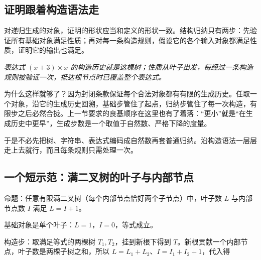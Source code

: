 \subsection{证明跟着构造语法走}

对递归生成的对象，证明的形状应当和定义的形状一致。结构归纳只有两步：先验证所有基础对象满足性质；再对每一条构造规则，假设它的各个输入对象都满足性质，证明它的输出也满足。

\begin{center}

\emph{表达式 \((x+3)\times x\) 的构造历史就是这棵树；性质从叶子出发，每经过一条构造规则被验证一次，抵达根节点时已覆盖整个表达式。}
\end{center}

为什么这样就够了？因为封闭条款保证每个合法对象都有有限的生成历史。任取一个对象，沿它的生成历史回溯，基础步管住了起点，归纳步管住了每一次构造，有限步之后必然合拢。上一节要求的良基顺序在这里也有了着落：``更小''就是``在生成历史中更早''，生成步数是一个取值于自然数、严格下降的度量。

于是不必先把树、字符串、表达式编码成自然数再套普通归纳。沿构造语法一层层走上去就行，而且每条规则只需处理一次。

\subsection{一个短示范：满二叉树的叶子与内部节点}

命题：任意有限满二叉树（每个内部节点恰好两个子节点）中，叶子数 \(L\) 与内部节点数 \(I\) 满足 \(L=I+1\)。

基础对象是单个叶子：\(L=1\)，\(I=0\)，等式成立。

构造步：取满足等式的两棵树 \(T_1,T_2\)，挂到新根下得到 \(T\)。新根贡献一个内部节点，叶子数是两棵子树之和，所以 \(L=L_1+L_2\)、\(I=I_1+I_2+1\)，代入得

